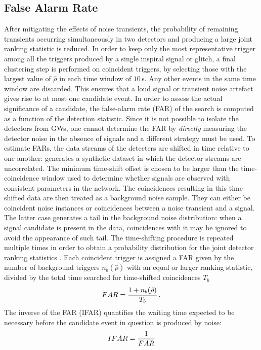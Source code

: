 \documentclass[binding=0.6cm, LaM]{sapthesis}
\begin{document}
\subsection{False Alarm Rate}
\label{subsec:far}
	After mitigating the effects of noise transients, the probability of remaining transients 
	occurring simultaneously in two detectors and producing a large joint 
	ranking statistic is reduced.
	In order to keep only the most representative trigger among all the triggers produced by a single inspiral signal or glitch, 
	a final clustering step is performed on coincident triggers, 
	by selecting those with the largest value of $\hat \rho$ 
	in each time window of $10$\,s. 
	Any other events in the same time window are discarded. 
	This ensures that a loud signal or transient noise artefact gives rise to at most one candidate event.
	In order to assess the actual significance of a candidate, 
	the false-alarm rate (FAR) of the search is computed as a function of the detection statistic.
  	Since it is not possible to isolate the detectors from GWs, 
	one cannot determine the FAR by \emph{directly} measuring the detector noise in the absence 
	of signals and a different strategy must be used.
 	To estimate FARs, the data streams of the detecters are shifted in time relative to one another: 
	generates a synthetic dataset in which the detector streams are uncorrelated.  
	The minimum time-shift offset is chosen to be larger than the time-coincidence window 
	used to determine whether signals are observed with consistent parameters in the network.
	The coincidences resulting in this time-shifted data are then treated as a background noise sample.  
	They can either be coincident noise instances or coincidences between a noise transient and a signal.  
	The latter case generates a tail in the background noise distribution: 
	when a signal candidate is present in the data, coincidences with it 
	may be ignored to avoid the appearance of such tail.
	The time-shifting procedure is repeated multiple times in order to obtain a probability distribution 
	for the joint detector ranking statistics \cite{44}. 
	Each coincident trigger is assigned a FAR given by the number 
	of background triggers $n_b(\hat \rho)$ with an equal or larger ranking statistic, 
	divided by the total time searched for time-shifted coincidences $T_b$
        \begin{equation}
          FAR = {{1 + n_b(\hat \rho)} \over {T_b}}\,.
        \end{equation}
        The inverse of the FAR (IFAR) quantifies the waiting time expected to be necessary 
	before the candidate event in question is produced by noise:
        \begin{equation}
          IFAR = {1 \over {FAR}}
        \end{equation}
\end{document}
